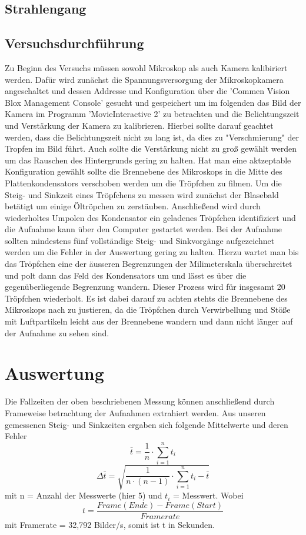 \documentclass{scrartcl}
\begin{document}
	\subsection{Strahlengang}
		

	\subsection{Versuchsdurchführung}
		Zu Beginn des Versuchs müssen sowohl Mikroskop als auch Kamera kalibiriert werden. Dafür wird zunächst die
		Spannungsversorgung der Mikroskopkamera angeschaltet und dessen Addresse und Konfiguration über die 'Commen Vision Blox Management Console'
		gesucht und gespeichert um im folgenden das Bild der Kamera im Programm 'MovieInteractive 2' zu betrachten
		und die Belichtungszeit und Verstärkung der Kamera zu kalibrieren. Hierbei sollte darauf geachtet werden, dass die 
		Belichtungszeit nicht zu lang ist, da dies zu "Verschmierung" der Tropfen im Bild führt. Auch sollte 
		die Verstärkung nicht zu groß gewählt werden um das Rauschen des Hintergrunds gering zu halten. Hat man 
		eine aktzeptable Konfiguration gewählt sollte die Brennebene des Mikroskops in die Mitte des Plattenkondensators
		verschoben werden um die Tröpfchen zu filmen.
		Um die Steig- und Sinkzeit eines Tröpfchens zu messen wird zunächst der Blasebald betätigt um einige
		Öltröpchen zu zerstäuben. Anschließend wird durch wiederholtes Umpolen des Kondensator ein geladenes Tröpfchen 
		identifiziert und die Aufnahme kann über den Computer gestartet werden. Bei der Aufnahme sollten mindestens fünf
		vollständige Steig- und Sinkvorgänge aufgezeichnet werden um die Fehler in der Auswertung gering zu halten.
		Hierzu wartet man bis das Tröpfchen eine der äusseren Begrenzungen der Milimeterskala überschreitet und polt dann
		das Feld des Kondensators um und lässt es über die gegenüberliegende Begrenzung wandern.
		Dieser Prozess wird für insgesamt 20 Tröpfchen wiederholt. Es ist dabei darauf zu achten stehts
		die Brennebene des Mikroskops nach zu justieren, da die Tröpfchen durch Verwirbellung und Stöße mit 
		Luftpartikeln leicht aus der Brennebene wandern und dann nicht länger auf der Aufnahme zu sehen sind.
\section{Auswertung}
	Die Fallzeiten der oben beschriebenen Messung können anschließend durch Frameweise betrachtung der Aufnahmen
	extrahiert werden.
	Aus unseren gemessenen Steig- und Sinkzeiten ergaben sich folgende Mittelwerte und deren Fehler
	\begin{equation}
		\bar{t} = \frac{1}{n} \cdot \sum_{i=1}^n t_i
	\end{equation}
	\begin{equation}
		\Delta \bar{t} = \sqrt{\frac{1}{n\cdot(n-1)}\cdot \sum_{i=1}^n{t_i - \bar{t}}}
	\end{equation}
	mit n = Anzahl der Messwerte (hier 5) und $t_i$ = Messwert.
	Wobei 
	\begin{equation}
		t = \frac{Frame(Ende)-Frame(Start)}{Framerate}
	\end{equation}
	mit Framerate = 32,792 Bilder/s, somit ist t in Sekunden.
\end{document}
